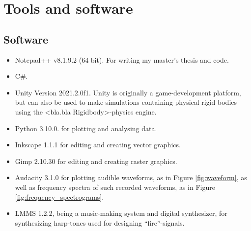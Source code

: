 \chapter{Tools and software}
\label{chap:tools_and_software}








\section{Software}

\begin{itemize}
	\item Notepad++ v8.1.9.2 (64 bit). For writing my master's thesis and code.
	
	\item C\#.
	
	\item Unity Version 2021.2.0f1. Unity is originally a game-development platform, but can also be used to make  simulations containing physical rigid-bodies using the <bla.bla Rigidbody>-physics engine.
	
	\item Python 3.10.0. for plotting and analysing data.
	
	\item Inkscape 1.1.1 for editing and creating vector graphics.
	
	\item Gimp 2.10.30 for editing and creating raster graphics.
	
	\item Audacity 3.1.0 for plotting audible waveforms, as in Figure \ref{fig:waveform}, as well as frequency spectra of such recorded waveforms, as in Figure \ref{fig:frequency_spectrograms}.
	
	\item LMMS 1.2.2, being a music-making system and digital synthesizer, for synthesizing harp-tones used for designing ``fire''-signals.
\end{itemize}

